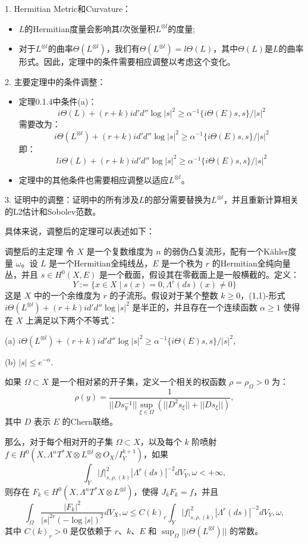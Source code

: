 \documentclass[lang=cn,12pt,fontset=none,a4paper]{beautybook}
\begin{document}
1. Hermitian Metric和Curvature：
\begin{itemize}
   \item $L$的Hermitian度量会影响其$l$次张量积$L^{\otimes l}$的度量;
   \item 对于$L^{\otimes l}$的曲率$\Theta(L^{\otimes l})$，我们有$\Theta(L^{\otimes l}) = l\Theta(L)$，其中$\Theta(L)$是$L$的曲率形式。因此，定理中的条件需要相应调整以考虑这个变化。
\end{itemize}

2. 主要定理中的条件调整：
\begin{itemize}
   \item 定理0.1.4中条件(a)：
         $$ i\Theta(L) + (r + k) id'd'' \log |s|^2 \geq \alpha^{-1} \{i\Theta(E)s, s\}/|s|^2 $$
         需要改为：
         $$ i\Theta(L^{\otimes l}) + (r + k) id'd'' \log |s|^2 \geq \alpha^{-1} \{i\Theta(E)s, s\}/|s|^2 $$
         即：
         $$ li\Theta(L) + (r + k) id'd'' \log |s|^2 \geq \alpha^{-1} \{i\Theta(E)s, s\}/|s|^2 $$
   \item 定理中的其他条件也需要相应调整以适应$L^{\otimes l}$。
\end{itemize}


3. 证明中的调整：证明中的所有涉及$L$的部分需要替换为$L^{\otimes l}$，并且重新计算相关的L2估计和Sobolev范数。

具体来说，调整后的定理可以表述如下：

调整后的主定理
令 $X$ 是一个复数维度为 $n$ 的弱伪凸复流形，配有一个Kähler度量 $\omega$。设 $L$ 是一个Hermitian全纯线丛，$E$ 是一个秩为 $r$ 的Hermitian全纯向量丛，并且 $s \in H^0(X, E)$ 是一个截面，假设其在零截面上是一般横截的。定义：
$$ Y := \{x \in X \mid s(x) = 0, \Lambda^r(ds)(x) \neq 0\} $$
这是 $X$ 中的一个余维度为 $r$ 的子流形。假设对于某个整数 $k \geq 0$，(1,1)-形式 $i\Theta(L^{\otimes l}) + (r+k) id'd'' \log |s|^2$ 是半正的，并且存在一个连续函数 $\alpha \geq 1$ 使得在 $X$ 上满足以下两个不等式：

(a) \(i\Theta(L^{\otimes l}) + (r+k) id'd'' \log |s|^2 \geq \alpha^{-1} \{i\Theta(E)s, s\}/|s|^2\),

(b) \(|s| \leq e^{-\alpha}\).

如果 $\Omega \subset X$ 是一个相对紧的开子集，定义一个相关的权函数 \(\rho = \rho_\Omega > 0\) 为：
$$ \rho(y) = \frac{1}{||D s^{-1}_y|| \sup_{\xi \in \Omega} (||D^2 s_\xi|| + ||D s_\xi||)}, $$
其中 $D$ 表示 $E$ 的Chern联络。

那么，对于每个相对开的子集 $\Omega \subset X$，以及每个 $k$ 阶喷射 $f \in H^0(X, \Lambda^n T^* X \otimes L^{\otimes l} \otimes O_X / I^{k+1}_Y)$，如果
$$ \int_Y |f|^2_{s, \rho, (k)} |\Lambda^r(ds)|^{-2} dV_Y, \omega < +\infty, $$
则存在 \(F_k \in H^0(X, \Lambda^n T^* X \otimes L^{\otimes l})\)，使得 \(J_k F_k = f\)，并且
$$ \int_\Omega \frac{|F_k|^2}{|s|^{2r} (-\log |s|)^2} dV_X, \omega \leq C(k)_r \int_Y |f|^2_{s, \rho, (k)} |\Lambda^r(ds)|^{-2} dV_Y, \omega, $$
其中 \(C(k)_r > 0\) 是仅依赖于 $r$、$k$、$E$ 和 $\sup_\Omega ||i\Theta(L^{\otimes l})||$ 的常数。
\end{document}

